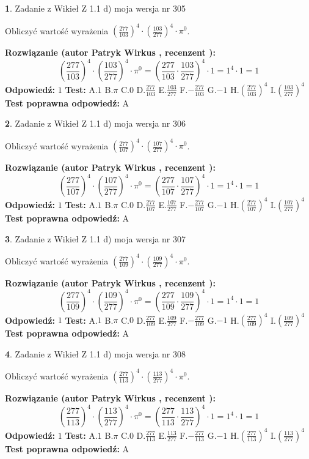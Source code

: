 \documentclass[12pt, a4paper]{article}
\theoremstyle{definition} %
\newtheorem{zad}{}
\newcommand{\zadStart}[1]{\begin{zad}#1\newline}
\newcommand{\zadStop}{\end{zad}}
\newcommand{\rozwStart}[2]{\noindent \textbf{Rozwiązanie (autor #1 , recenzent #2): }\newline}
\newcommand{\rozwStop}{\newline}
\newcommand{\odpStart}{\noindent \textbf{Odpowiedź:}\newline}
\newcommand{\odpStop}{\newline}
\newcommand{\testStart}{\noindent \textbf{Test:}\newline}
\newcommand{\testStop}{\newline}
\newcommand{\kluczStart}{\noindent \textbf{Test poprawna odpowiedź:}\newline}
\newcommand{\kluczStop}{\newline}
\begin{document}
\zadStart{Zadanie z Wikieł Z 1.1 d) moja wersja nr 305}

Obliczyć wartość wyrażenia $(\frac{277}{103})^{4} \cdot (\frac{103}{277})^{4} \cdot \pi^{0}$.
\zadStop
\rozwStart{Patryk Wirkus}{}
$$(\frac{277}{103})^{4} \cdot (\frac{103}{277})^{4} \cdot \pi^{0} = (\frac{277}{103} \cdot \frac{103}{277})^{4} \cdot 1 = 1^{4} \cdot 1 = 1$$
\rozwStop
\odpStart
$1$
\odpStop
\testStart
A.$1$ B.$\pi$ C.$0$ D.$\frac{277}{103}$ E.$\frac{103}{277}$
F.$-\frac{277}{103}$ G.$-1$
H.$(\frac{277}{103})^{4}$
I.$(\frac{103}{277})^{4}$
\testStop
\kluczStart
A
\kluczStop



\zadStart{Zadanie z Wikieł Z 1.1 d) moja wersja nr 306}

Obliczyć wartość wyrażenia $(\frac{277}{107})^{4} \cdot (\frac{107}{277})^{4} \cdot \pi^{0}$.
\zadStop
\rozwStart{Patryk Wirkus}{}
$$(\frac{277}{107})^{4} \cdot (\frac{107}{277})^{4} \cdot \pi^{0} = (\frac{277}{107} \cdot \frac{107}{277})^{4} \cdot 1 = 1^{4} \cdot 1 = 1$$
\rozwStop
\odpStart
$1$
\odpStop
\testStart
A.$1$ B.$\pi$ C.$0$ D.$\frac{277}{107}$ E.$\frac{107}{277}$
F.$-\frac{277}{107}$ G.$-1$
H.$(\frac{277}{107})^{4}$
I.$(\frac{107}{277})^{4}$
\testStop
\kluczStart
A
\kluczStop



\zadStart{Zadanie z Wikieł Z 1.1 d) moja wersja nr 307}

Obliczyć wartość wyrażenia $(\frac{277}{109})^{4} \cdot (\frac{109}{277})^{4} \cdot \pi^{0}$.
\zadStop
\rozwStart{Patryk Wirkus}{}
$$(\frac{277}{109})^{4} \cdot (\frac{109}{277})^{4} \cdot \pi^{0} = (\frac{277}{109} \cdot \frac{109}{277})^{4} \cdot 1 = 1^{4} \cdot 1 = 1$$
\rozwStop
\odpStart
$1$
\odpStop
\testStart
A.$1$ B.$\pi$ C.$0$ D.$\frac{277}{109}$ E.$\frac{109}{277}$
F.$-\frac{277}{109}$ G.$-1$
H.$(\frac{277}{109})^{4}$
I.$(\frac{109}{277})^{4}$
\testStop
\kluczStart
A
\kluczStop



\zadStart{Zadanie z Wikieł Z 1.1 d) moja wersja nr 308}

Obliczyć wartość wyrażenia $(\frac{277}{113})^{4} \cdot (\frac{113}{277})^{4} \cdot \pi^{0}$.
\zadStop
\rozwStart{Patryk Wirkus}{}
$$(\frac{277}{113})^{4} \cdot (\frac{113}{277})^{4} \cdot \pi^{0} = (\frac{277}{113} \cdot \frac{113}{277})^{4} \cdot 1 = 1^{4} \cdot 1 = 1$$
\rozwStop
\odpStart
$1$
\odpStop
\testStart
A.$1$ B.$\pi$ C.$0$ D.$\frac{277}{113}$ E.$\frac{113}{277}$
F.$-\frac{277}{113}$ G.$-1$
H.$(\frac{277}{113})^{4}$
I.$(\frac{113}{277})^{4}$
\testStop
\kluczStart
A
\kluczStop
\end{document}
